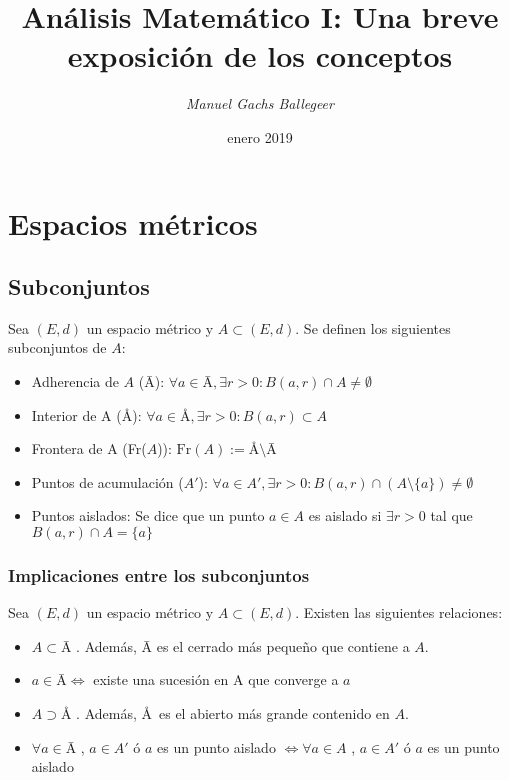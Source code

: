 \documentclass[11pt,titlepage,a4paper]{article}
\begin{document}
\title{\Huge{\textbf{Análisis Matemático I: Una breve exposición de los conceptos}}}
\author{\textit{Manuel Gachs Ballegeer}}
\date{enero 2019}
\maketitle

\tableofcontents
\clearpage

\section{Espacios métricos}
\subsection{Subconjuntos}
Sea $(E,d)$ un espacio métrico y $A\subset(E,d)$. Se definen los siguientes subconjuntos de $A$:
\begin{itemize}
\item Adherencia de $A$ (\=A): 
$\forall a\in\text{\=A},\exists r>0:B(a,r)\cap A\neq\emptyset$
\item Interior de A (\AA):
$\forall a\in\text{\AA},\exists r>0:B(a,r)\subset A$
\item Frontera de A (Fr($A$)):
$\text{Fr}(A):=\text{\AA}\setminus\text{\=A}$
\item Puntos de acumulación ($A'$):
$\forall a\in A',\exists r>0:B(a,r)\cap(A\setminus\{a\})\neq\emptyset$ 
\item Puntos aislados: 
Se dice que un punto $a\in A$ es aislado si $\exists r>0$ tal que $B(a,r)\cap A=\{a\}$
\end{itemize}

\subsubsection*{Implicaciones entre los subconjuntos}
Sea $(E,d)$ un espacio métrico y $A\subset(E,d)$. Existen las siguientes relaciones:
\begin{itemize}
\item $A\subset\text{\=A}$ . Además, \=A es el cerrado más pequeño que contiene a $A$.
\item $a\in\text{\=A}\iff$ existe una sucesión en A que converge a $a$
\item $A\supset\text{\AA}$ . Además, \AA\ es el abierto más grande contenido en $A$.
\item $\forall a\in\text{\=A}$ , $a\in A'$ ó $a$ es un punto aislado $\iff\forall a\in A$ , $a\in A'$ ó $a$ es un punto aislado
\end{itemize}
\end{document}
